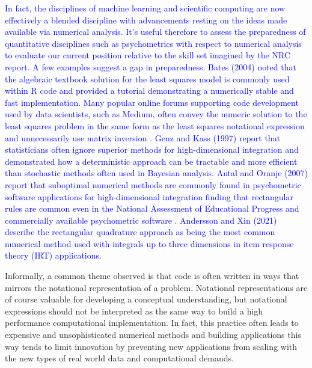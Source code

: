 \documentclass[12pt]{article}
\begin{document}
\textcolor{blue}{In fact, the disciplines of machine learning and scientific computing are now effectively a blended discipline \cite{hao,innes} with advancements resting on the ideas made available via numerical analysis. It's useful therefore to assess the preparedness of quantitative disciplines such as psychometrics with respect to numerical analysis to evaluate our current position relative to the skill set imagined by the NRC report. A few examples suggest a gap in preparedness. Bates (2004)\nocite{Rnews:Bates:2004} noted that the algebraic textbook solution for the least squares model is commonly used within R code and provided a tutorial demonstrating a numerically stable and fast implementation. Many popular online forums supporting code development used by data scientists, such as Medium, often convey the numeric solution to the least squares problem in the same form as the least squares notational expression and unnecessarily use matrix inversion \cite{Koseoglu}. Genz and Kass (1997) report that statisticians often ignore superior methods for high-dimensional integration and demonstrated how a deterministic approach can be tractable and more efficient than stochastic methods often used in Bayesian analysis. Antal and Oranje (2007) report that suboptimal numerical methods are commonly found in psychometric software applications for high-dimensional integration finding that rectangular rules are common even in the National Assessment of Educational Progress \cite{nces} and commercially available psychometric software \cite{parscale}. Andersson and Xin (2021) describe the rectangular quadrature approach as being the most common numerical method used with integrals up to three dimensions in item response theory (IRT) applications.} \nocite{genz,ets:2007} \nocite{bjorn}

Informally, a common theme observed is that code is often written in ways that mirrors the notational representation of a problem. Notational representations are of course valuable for developing a conceptual understanding, but notational expressions should not be interpreted as the same way to build a high performance computational implementation. In fact, this practice often leads to expensive and unsophisticated numerical methods and building applications this way tends to limit innovation by preventing new applications from scaling with the new types of real world data and computational demands. 
\end{document}
